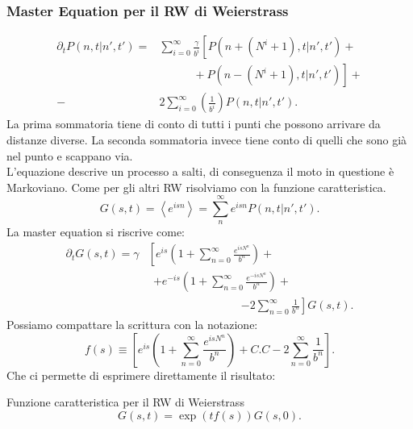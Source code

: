 \subsubsection{Master Equation per il RW di Weierstrass}%
\label{subsub:Master Equation per il RW di Weierstrass}
\[\begin{aligned}
    \partial_{t}P\left(n,t|n',t'\right) = &\sum_{i=0}^{\infty} 
    \frac{\gamma}{b^{i}} \left[P\left(n+(N^{i}+1) ,t|n',t'\right) \right. + \\
		    & \qquad \quad + \left. P\left(n-(N^{i}+1) ,t|n',t'\right)\right] + \\
		     - &2 \sum_{i=0}^{\infty} \left(\frac{1}{b^{i}}\right) P\left(n,t|n',t'\right)
.\end{aligned}\]
La prima sommatoria tiene di conto di tutti i punti che possono arrivare da distanze diverse. La seconda sommatoria invece tiene conto di quelli che sono già nel punto e scappano via.\\
L'equazione descrive un processo a salti, di conseguenza il moto in questione è Markoviano. Come per gli altri RW risolviamo con la funzione caratteristica.
\[
    G(s,t) = \left<e^{isn}\right> = \sum_{n}^{\infty} e^{isn}P(n,t|n',t') 
.\] 
La master equation si riscrive come:
\[\begin{aligned}
    \partial_{t}G(s,t) = \gamma &\left[e^{is}\left( 1 + \sum_{n=0}^{\infty} \frac{e^{isN^{n}}}{b^{n}} \right) + \right.\\  
				& \ \ \left. + e^{-is}\left( 1 + \sum_{n=0}^{\infty} \frac{e^{-isN^{n}}}{b^{n}} \right) + \right.\\
				& \qquad \qquad \qquad \qquad \ \left.- 2 \sum_{n=0}^{\infty} \frac{1}{b^n} \right]G(s,t) 
.\end{aligned}\]
Possiamo compattare la scrittura con la notazione:
\[
    f(s) \equiv \left[e^{is}\left( 1 + \sum_{n=0}^{\infty} \frac{e^{isN^{n}}}{b^{n}} \right) + C.C - 2 \sum_{n=0}^{\infty} \frac{1}{b^n} \right]
.\] 
Che ci permette di esprimere direttamente il risultato:
\begin{bluebox}{Funzione caratteristica per il RW di Weierstrass}
\[
    G(s,t) = \exp\left(tf(s)\right)G(s,0) 
.\]     
\end{bluebox}
\noindent

